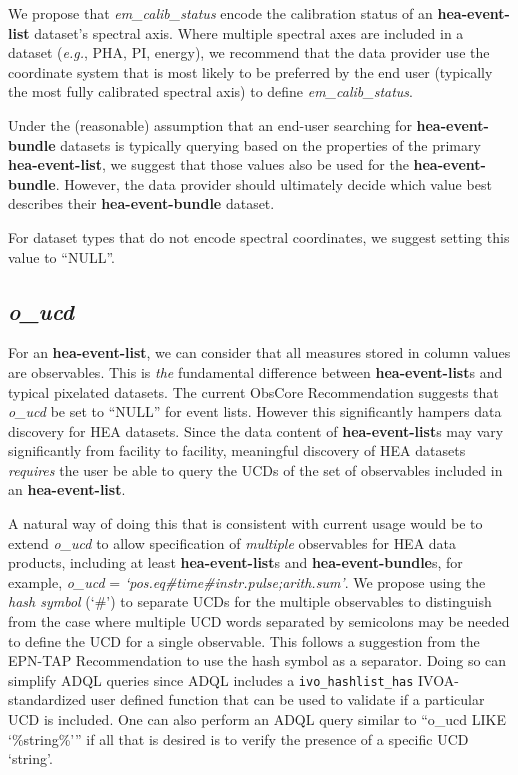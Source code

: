 \documentclass[11pt,a4paper]{ivoa}
\begin{document}
We propose that {\em em\_calib\_status\/} encode the calibration status of an {\bf hea-event-list} dataset's spectral axis.  Where multiple spectral axes are included in a dataset ({\em e.g.\/}, PHA, PI, energy), we recommend that the data provider use the coordinate system that is most likely to be preferred by the end user (typically the most fully calibrated spectral axis) to define {\em em\_calib\_status\/}.

Under the (reasonable) assumption that an end-user searching for {\bf hea-event-bundle} datasets is typically querying based on the properties of the primary {\bf hea-event-list}, we suggest that those values also be used for the {\bf hea-event-bundle}.  However, the data provider should ultimately decide which value best describes their {\bf hea-event-bundle} dataset.

For dataset types that do not encode spectral coordinates, we suggest setting this value to ``NULL''.

\subsection{{\em o\_ucd}}

For an {\bf hea-event-list}, we can consider that all measures stored in column values are observables. This is {\em the\/} fundamental difference between {\bf hea-event-list}s and typical pixelated datasets. The current ObsCore Recommendation suggests that {\em o\_ucd\/} be set to ``NULL'' for event lists. However this significantly hampers data discovery for \gls{HEA} datasets. Since the data content of {\bf hea-event-list}s may vary significantly from facility to facility, meaningful discovery of \gls{HEA} datasets {\em requires\/} the user be able to query the UCDs of the set of observables included in an {\bf hea-event-list}.

A natural way of doing this that is consistent with current usage would be to extend {\em o\_ucd\/} to allow specification of {\em multiple\/} observables for \gls{HEA} data products, including at least {\bf hea-event-list}s and {\bf hea-event-bundle}s, for example, {\em o\_ucd\/} =  {\em `pos.eq\#time\#instr.pulse;arith.sum'\/}.  We propose using the {\em hash symbol\/} (`\#') to separate UCDs for the multiple observables to distinguish from the case where multiple UCD words separated by semicolons may be needed to define the UCD for a single observable.  This follows a suggestion from the EPN-TAP Recommendation \citep{2022ivoa.spec.0822E} to use the hash symbol as a separator. Doing so can simplify ADQL queries since ADQL includes a {\tt ivo\_hashlist\_has} IVOA-standardized user defined function that can be used to validate if a particular UCD is included.  One can also perform an ADQL query similar to ``o\_ucd LIKE `\%string\%'\null'' if all that is desired is to verify the presence of a specific UCD `string'.
\end{document}

